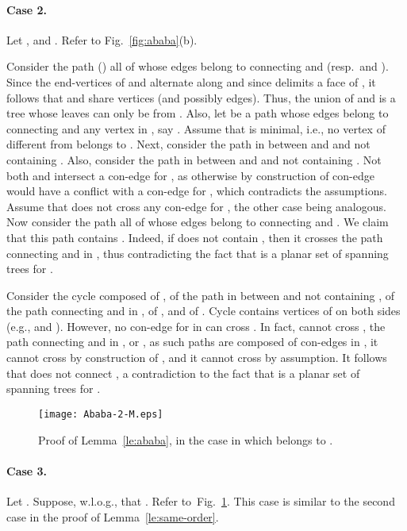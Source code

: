 \documentclass[letter,runningheads]{llncs}
\renewenvironment{proof}
{{\em Proof.\ }}{\hspace*{\fill}\par\vspace{2mm}}
\begin{document}
\begin{proof}
\paragraph{Case 2.} Let , and . Refer to Fig.~\ref{fig:ababa}(b).

Consider the path  () all of whose edges belong to  connecting  and  (resp.\  and ). Since the end-vertices of  and  alternate along  and since  delimits a face of , it follows that  and  share vertices (and possibly edges). Thus, the union of  and  is a tree  whose leaves can only be from . Also, let  be a path whose edges belong to  connecting  and any vertex in , say . Assume that  is minimal, i.e., no vertex of  different from  belongs to .
Next, consider the path  in  between  and  and not containing . Also, consider the path  in  between  and  and not containing . Not both  and  intersect a con-edge for , as otherwise by construction of  con-edge  would have a conflict with a con-edge for , which contradicts the assumptions. Assume that  does not cross any con-edge for , the other case being analogous.
Now consider the path  all of whose edges belong to  connecting  and . We claim that this path contains . Indeed, if  does not contain , then it crosses the path connecting  and  in , thus contradicting the fact that  is a planar set of spanning trees for .

Consider the cycle  composed of , of the path  in  between  and  not containing , of the path connecting  and  in , of , and of . Cycle  contains vertices of  on both sides (e.g.,  and ). However, no con-edge  for  in  can cross . In fact,  cannot cross , the path connecting  and  in , or , as such paths are composed of con-edges in , it cannot cross  by construction of , and it cannot cross  by assumption. It follows that  does not connect , a contradiction to the fact that  is a planar set of spanning trees for .

\begin{figure}[tb]
\begin{center}
\mbox{\texttt{[image: Ababa-2-M.eps]}}
\caption{Proof of Lemma~\ref{le:ababa}, in the case in which  belongs to .}
\label{fig:ababa-2}
\end{center}
\end{figure}

\paragraph{Case 3.} Let . Suppose, w.l.o.g., that . Refer to~Fig.~\ref{fig:ababa-2}. This case is similar to the second case in the proof of Lemma~\ref{le:same-order}.


\end{proof}
\end{document}
